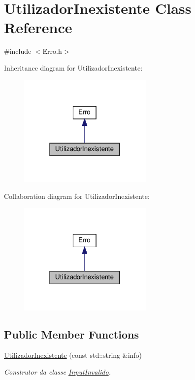 \hypertarget{classUtilizadorInexistente}{}\section{Utilizador\+Inexistente Class Reference}
\label{classUtilizadorInexistente}


{\ttfamily \#include $<$Erro.\+h$>$}



Inheritance diagram for Utilizador\+Inexistente\+:
\nopagebreak
\begin{figure}[H]
\begin{center}
\leavevmode
\includegraphics[width=186pt]{classUtilizadorInexistente__inherit__graph}
\end{center}
\end{figure}


Collaboration diagram for Utilizador\+Inexistente\+:
\nopagebreak
\begin{figure}[H]
\begin{center}
\leavevmode
\includegraphics[width=186pt]{classUtilizadorInexistente__coll__graph}
\end{center}
\end{figure}
\subsection*{Public Member Functions}
\begin{DoxyCompactItemize}
\item 
\hyperlink{classUtilizadorInexistente_a66c90c46c5b2a33fa21fe40eb80cf2f8}{Utilizador\+Inexistente} (const std\+::string \&info)
\begin{DoxyCompactList}\small\item\em Construtor da classe \hyperlink{classInputInvalido}{Input\+Invalido}. \end{DoxyCompactList}\end{DoxyCompactItemize}


